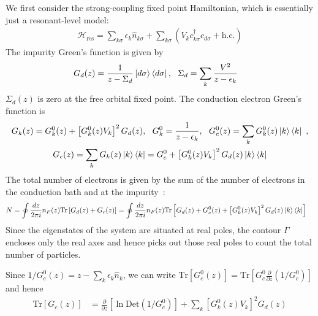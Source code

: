 \documentclass{report}
\numberwithin{equation}{section}
\begin{document}
We first consider the strong-coupling fixed point Hamiltonian, which is essentially just a resonant-level model:
\begin{equation}\begin{aligned}
	\mathcal{H}_\text{res} = \sum_{k\sigma}\epsilon_k \hat n_{k\sigma} + \sum_{k\sigma}\left(V_k c^\dagger_{k\sigma} c_{d\sigma} + \text{h.c.}\right)
\end{aligned}\end{equation}
The impurity Green's function is given by~\cite{anderson_1961,hewson1993,coleman2015}
\begin{equation}\begin{aligned}
	G_{d}(z) &= \frac{1}{z - \Sigma_d}\ket{d\sigma}\bra{d\sigma}, ~ ~ \Sigma_d = \sum_k \frac{V^2}{z - \epsilon_k}
\end{aligned}\end{equation}
\(\Sigma_d(z)\) is zero at the free orbital fixed point. The conduction electron Green's function is 
\begin{gather}
	G_{k}(z) = G_k^0(z) + \left[G_k^0(z)V_k\right]^2 G_{d}(z), ~ ~ G_k^0 = \frac{1}{z - \epsilon_k}, ~ ~ G_c^0(z) = \sum_k G_k^0(z)\ket{k}\bra{k}~,\\
	G_c(z) = \sum_k G_k(z)\ket{k}\bra{k} = G_c^0 + \left[G_k^0(z)V_k\right]^2 G_{d}(z)\ket{k}\bra{k} 
\end{gather}
The total number of electrons is given by the sum of the number of electrons in the conduction bath and at the impurity~\cite{hewson1993,langreth1966}:
\begin{equation}\begin{aligned}
	\label{tot_num}
	N &= \oint \frac{dz}{2\pi i}n_F(z) \text{Tr}\left[G_{d}(z) + G_c(z)\right] = \oint \frac{dz}{2\pi i}n_F(z) \text{Tr}\left[G_{d}(z) + G_c^0(z) + \left[G_k^0(z)V_k\right]^2 G_{d}(z)\ket{k}\bra{k}\right]
\end{aligned}\end{equation}
Since the eigenstates of the system are situated at real poles, the contour \(\Gamma\) encloses only the real axes and hence picks out those real poles to count the total number of particles.

Since \(1/G_{c}^0(z) = z - \sum_k \epsilon_k \hat n_k\), we can write \(\text{Tr}\left[G_{c}^{0}(z)\right] = \text{Tr}\left[G_{c}^{0} \frac{\partial{}}{\partial{z}}\left(1/G_{c}^{0}\right)\right]\) and hence
\begin{equation}\begin{aligned}
	\label{simple_bath}
	\text{Tr}\left[G_c(z)\right] &=\frac{\partial{}}{\partial{z}}\left[\ln \text{Det}\left(1/G_{c}^{0}\right)\right] + \sum_k\left[G_k^0(z)V_k\right]^2 G_{d}(z)
\end{aligned}\end{equation}
\end{document}
